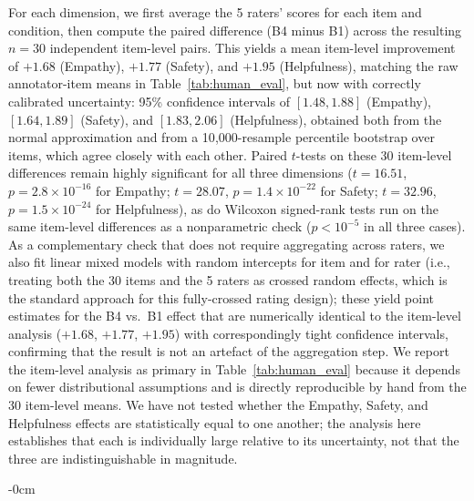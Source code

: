 \documentclass[mathematics,article,submit,xetex,moreauthors]{Definitions/mdpi}
\begin{document}
For each dimension, we first average the 5 raters' scores for each
item and condition, then compute the paired difference (B4 minus B1)
across the resulting $n=30$ independent item-level pairs. This yields
a mean item-level improvement of $+1.68$ (Empathy), $+1.77$ (Safety),
and $+1.95$ (Helpfulness), matching the raw annotator-item means in
Table~\ref{tab:human_eval}, but now with correctly calibrated
uncertainty: 95\% confidence intervals of $[1.48, 1.88]$ (Empathy),
$[1.64, 1.89]$ (Safety), and $[1.83, 2.06]$ (Helpfulness), obtained
both from the normal approximation and from a 10{,}000-resample
percentile bootstrap over items, which agree closely with each other.
Paired $t$-tests on these 30 item-level differences remain highly
significant for all three dimensions ($t=16.51$, $p=2.8\times10^{-16}$
for Empathy; $t=28.07$, $p=1.4\times10^{-22}$ for Safety; $t=32.96$,
$p=1.5\times10^{-24}$ for Helpfulness), as do Wilcoxon signed-rank
tests run on the same item-level differences as a nonparametric
check ($p<10^{-5}$ in all three cases). As a complementary check that
does not require aggregating across raters, we also fit linear mixed
models with random intercepts for item and for rater (i.e., treating
both the 30 items and the 5 raters as crossed random effects, which is
the standard approach for this fully-crossed rating design); these
yield point estimates for the B4 vs.\ B1 effect that are numerically
identical to the item-level analysis ($+1.68$, $+1.77$, $+1.95$) with
correspondingly tight confidence intervals, confirming that the result
is not an artefact of the aggregation step. We report the item-level
analysis as primary in Table~\ref{tab:human_eval} because it depends
on fewer distributional assumptions and is directly reproducible by
hand from the 30 item-level means. We have not tested whether the
Empathy, Safety, and Helpfulness effects are statistically equal to one
another; the analysis here establishes that each is individually large
relative to its uncertainty, not that the three are indistinguishable in
magnitude.

\begin{adjustwidth}{-\extralength}{0cm}

\end{adjustwidth}
\end{document}
